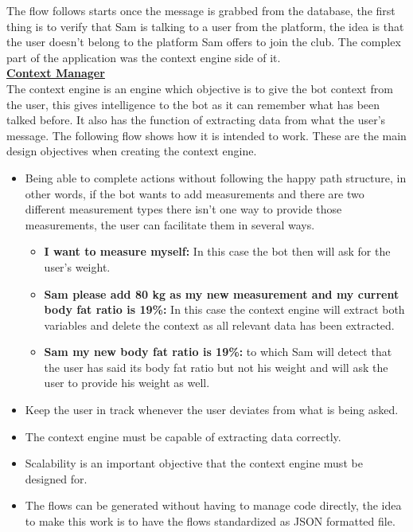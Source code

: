 The flow follows starts once the message is grabbed from the database, the first thing is to verify that Sam is talking to a user from the platform, the idea is that the user doesn’t belong to the platform Sam offers to join the club. The complex part of the application was the context engine side of it.\\

\textbf{\underline{Context Manager}}\label{sec:chap4_ori_cont_man}\\

The context engine is an engine which objective is to give the bot context from the user, this gives intelligence to the bot as it can remember what has been talked before. It also has the function of extracting data from what the user’s message. The following flow shows how it is intended to work. These are the main design objectives when creating the context engine.
\begin{itemize}
	\item{Being able to complete actions without following the happy path structure, in other words, if the bot wants to add measurements and there are two different measurement types there isn’t one way to provide those measurements, the user can facilitate them in several ways.
	\begin{itemize}
		\item{\textbf{I want to measure myself:} In this case the bot then will ask for the user’s weight.}
		\item{\textbf{Sam please add 80 kg as my new measurement and my current body fat ratio is 19\%:} In this case the context engine will extract both variables and delete the context as all relevant data has been extracted.}
		\item{\textbf{Sam my new body fat ratio is 19\%:} to which Sam will detect that the user has said its body fat ratio but not his weight and will ask the user to provide his weight as well.}
	\end{itemize}
	}
	\item{Keep the user in track whenever the user deviates from what is being asked.}
	\item{The context engine must be capable of extracting data correctly.}
	\item{Scalability is an important objective that the context engine must be designed for.}
	\item{The flows can be generated without having to manage code directly, the idea to make this work is to have the flows standardized as JSON formatted file. }
\end{itemize}

